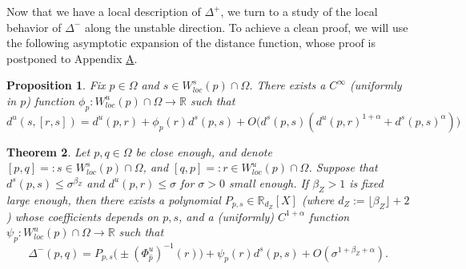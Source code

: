 \documentclass[a4paper]{article}
\newtheorem{theorem}{Theorem}[section]
\newtheorem{proposition}[theorem]{Proposition}
\theoremstyle{definition}
\begin{document}
Now that we have a local description of $\Delta^+$, we turn to a study of the local behavior of $\Delta^-$ along the unstable direction. To achieve a clean proof, we will use the following asymptotic expansion of the distance function, whose proof is postponed to Appendix \hyperref[ap:A]{A}.


\begin{proposition}\label{prop:dist}
Fix $p \in \Omega$ and $s \in W^s_{loc}(p) \cap \Omega$. There exists a $C^\infty$ (uniformly in $p$) function $\phi_{p}: W^u_{loc}(p) \cap \Omega \rightarrow \mathbb{R}$ such that
$$ d^u(s,[r,s]) = d^u(p,r) + \phi_{p}(r) d^s(p,s) + O\Big( 
d^s(p,s)(d^u(p,r)^{1+\alpha} + d^s(p,s)^{\alpha}) \Big) $$
\end{proposition}

\begin{theorem}
Let $p,q \in \Omega$ be close enough, and denote $[p,q] =: s \in W^s_{loc}(p) \cap \Omega$, and  $[q,p] =: r \in W^u_{loc}(p) \cap \Omega$. Suppose that $d^s(p,s) \leq \sigma^{\beta_Z}$ and $d^u(p,r) \leq \sigma$ for $\sigma>0$ small enough. If $\beta_Z>1$ is fixed large enough, then there exists a polynomial $P_{p,s} \in \mathbb{R}_{d_Z}[X]$ (where $d_Z :=\lfloor \beta_Z \rfloor + 2$) whose coefficients depends on $p,s$, and a (uniformly) $C^{1+\alpha}$ function $\psi_p : W^u_{loc}(p) \cap \Omega \rightarrow \mathbb{R}$ such that
$$ \Delta^-(p,q) = P_{p,s}\big( \pm(\Phi_{\widehat{p}}^u)^{-1}(r) \big) + 
\psi_p(r) d^s(p,s) + O(\sigma^{1+\beta_Z+\alpha}) .$$
\end{theorem}
\end{document}

